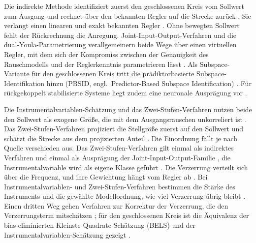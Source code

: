 Die indirekte Methode identifiziert zuerst den geschlossenen Kreis vom
Sollwert zum Ausgang und rechnet über den bekannten Regler auf die
Strecke zurück \cite{forssellClosedloopIdenticationRevisited1999}. Sie
verlangt einen linearen und exakt bekannten Regler
\cite{agueroVirtualClosedLoop2011}. Ohne bewegten Sollwert fehlt der
Rückrechnung die Anregung. Joint-Input-Output-Verfahren und die
dual-Youla-Parametrierung verallgemeinern beide Wege über einen
virtuellen Regler, mit dem sich der Kompromiss zwischen der Genauigkeit
des Rauschmodells und der Reglerkenntnis parametrieren lässt
\cite{agueroVirtualClosedLoop2011}%
. Als Subspace-Variante für den geschlossenen
Kreis tritt die prädiktorbasierte Subspace-Identifikation hinzu (PBSID,
engl.\ Predictor-Based Subspace Identification)%
. Für
rückgekoppelt stabilisierte Systeme liegt zudem eine neuronale Ausprägung
vor \cite{boroujeniNeuralIdentificationFeedbackStabilized2025}.

Die Instrumentalvariablen-Schätzung und das Zwei-Stufen-Verfahren nutzen
beide den Sollwert als exogene Größe, die mit dem Ausgangsrauschen
unkorreliert ist \cite{gilsonInstrumentalVariableMethods2005}. Das
Zwei-Stufen-Verfahren projiziert die Stellgröße zuerst auf den Sollwert
und schätzt die Strecke aus dem projizierten Anteil
\cite{vandenhofIdentificationDynamicModels2013}%
. Die Einordnung fällt je nach Quelle verschieden
aus. Das Zwei-Stufen-Verfahren gilt einmal als indirektes Verfahren
\cite{karimiComparisonClosedloopIdentification1998} und einmal als
Ausprägung der Joint-Input-Output-Familie
\cite{forssellClosedloopIdenticationRevisited1999}, die
Instrumentalvariable wird als eigene Klasse geführt
\cite{gilsonInstrumentalVariableMethods2005}.
Die Verzerrung verteilt sich über die Frequenz, und ihre Gewichtung hängt
vom Regler ab \cite{karimiComparisonClosedloopIdentification1998}. Bei
Instrumentalvariablen- und Zwei-Stufen-Verfahren bestimmen die Stärke des
Instruments und die gewählte Modellordnung, wie viel Verzerrung übrig
bleibt \cite{gilsonInstrumentalVariableMethods2005}. Einen dritten Weg
gehen Verfahren zur Korrektur der Verzerrung, die den Verzerrungsterm
mitschätzen
\cite{mejariBiascorrectionMethodClosedloop2018,mandloiMethodsClosedLoop2015};
für den geschlossenen Kreis ist die Äquivalenz der bias-eliminierten
Kleinste-Quadrate-Schätzung (BELS) und der Instrumentalvariablen-Schätzung
gezeigt \cite{gilsonRelationBiaseliminatedLeastsquares2001}.



